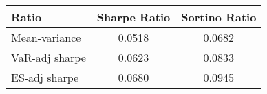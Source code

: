 \begin{tabular}{lcc}
\toprule
Ratio & Sharpe Ratio & Sortino Ratio\\
\midrule
Mean-variance & 0.0518 & 0.0682\\
VaR-adj sharpe & 0.0623 & 0.0833\\
ES-adj sharpe & 0.0680 & 0.0945\\
\bottomrule
\end{tabular}
